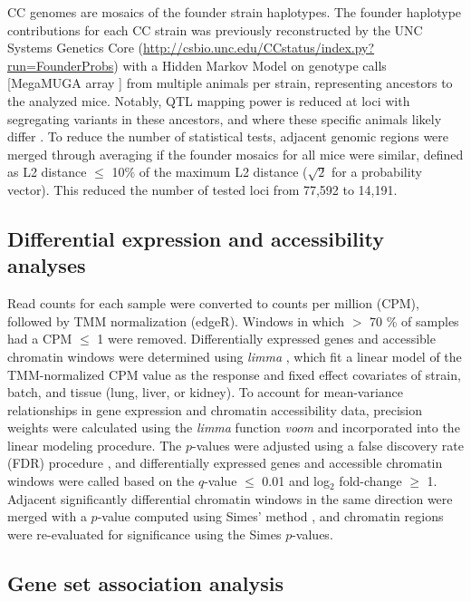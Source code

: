 \documentclass[10pt,letterpaper]{article}
\begin{document}
CC genomes are mosaics of the founder strain haplotypes. The founder haplotype contributions for each CC strain was previously reconstructed by the UNC Systems Genetics Core (\url{http://csbio.unc.edu/CCstatus/index.py?run=FounderProbs}) with a Hidden Markov Model \cite{Fu2012} on genotype calls [MegaMUGA array \cite{Morgan2016muga}] from multiple animals per strain, representing ancestors to the analyzed mice. Notably, QTL mapping power is reduced at loci with segregating variants in these ancestors, and where these specific animals likely differ \cite{Shorter2019}. To reduce the number of statistical tests, adjacent genomic regions were merged through averaging if the founder mosaics for all mice were similar, defined as L2 distance $\leq$ 10\% of the maximum L2 distance ($\sqrt{2}$ for a probability vector). This reduced the number of tested loci from 77,592 to 14,191.

\subsection*{Differential expression and accessibility analyses}

Read counts for each sample were converted to counts per million (CPM), followed by TMM normalization (edgeR). Windows in which $>$ 70 \% of samples had a CPM $\leq$ 1 were removed. Differentially expressed genes and accessible chromatin windows were determined using \textit{limma} \cite{limma}, which fit a linear model of the TMM-normalized CPM value as the response and fixed effect covariates of strain, batch, and tissue (lung, liver, or kidney). 
To account for mean-variance relationships in gene expression and chromatin accessibility data, precision weights were calculated using the \textit{limma} function \textit{voom} and incorporated into the linear modeling procedure. The $p$-values were adjusted using a false discovery rate (FDR) procedure \cite{Benjamini1995}, and differentially expressed genes and accessible chromatin windows were called based on the $q$-value $\le$ 0.01 and log$_{2}$ fold-change $\geq$ 1. Adjacent significantly differential chromatin windows in the same direction were merged with a $p$-value computed using Simes' method \cite{Sarkar1997}, and chromatin regions were re-evaluated for significance using the Simes $p$-values.

\subsection*{Gene set association analysis}
\end{document}
